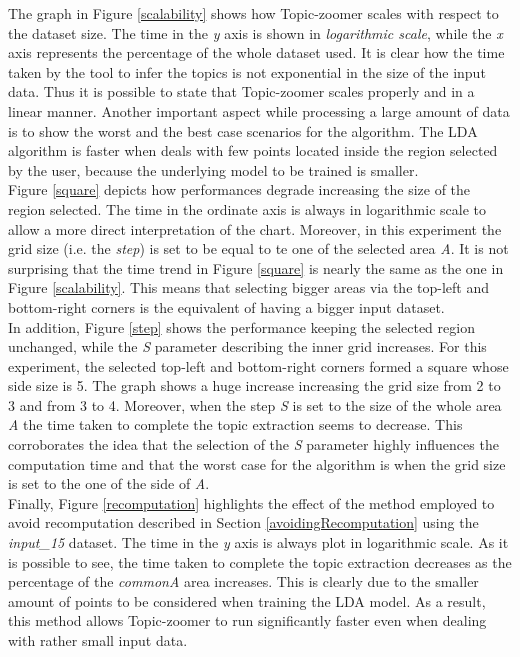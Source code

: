 \documentclass{sig-alternate-05-2015}
\begin{document}
The graph in Figure \ref{scalability} shows how Topic-zoomer scales with respect to the dataset size. The time in the \emph{y} axis is shown in \emph{logarithmic scale}, while the \emph{x} axis represents the percentage of the whole dataset used. It is clear how the time taken by the tool to infer the topics is not exponential in the size of the input data. Thus it is possible to state that Topic-zoomer scales properly and in a linear manner.  
Another important aspect while processing a large amount of data is to show the worst and the best case scenarios for the algorithm. The LDA algorithm is faster when deals with few points located inside the region selected by the user, because the underlying model to be trained is smaller.\\
Figure \ref{square} depicts how performances degrade increasing the size of the region selected. The time in the ordinate axis is always in logarithmic scale to allow a more direct interpretation of the chart. Moreover, in this experiment the grid size (i.e. the \emph{step}) is set to be equal to te one of the selected area \emph{A}. It is not surprising that the time trend in Figure \ref{square} is nearly the same as the one in Figure \ref{scalability}. This means that selecting bigger areas via the top-left and bottom-right corners is the equivalent of having a bigger input dataset.\\  
In addition, Figure \ref{step} shows the performance keeping the selected region unchanged, while the \emph{S} parameter describing the inner grid increases. For this experiment, the selected top-left and bottom-right corners formed a square whose side size is 5. The graph shows a huge increase increasing the grid size from 2 to 3 and from 3 to 4. Moreover, when the step \emph{S} is set to the size of the whole area \emph{A} the time taken to complete the topic extraction seems to decrease. This corroborates the idea that the selection of the \emph{S} parameter highly influences the computation time and that the worst case for the algorithm is when the grid size is set to the one of the side of \emph{A}.\\
Finally, Figure \ref{recomputation} highlights the effect of the method employed to avoid recomputation described in Section \ref{avoidingRecomputation} using the \emph{input\_15} dataset. The time in the \emph{y} axis is always plot in logarithmic scale. As it is possible to see, the time taken to complete the topic extraction decreases as the percentage of the \emph{commonA} area increases. This is clearly due to the smaller amount of points to be considered when training the LDA model. As a result, this method allows Topic-zoomer to run significantly faster even when dealing with rather small input data. 
\end{document}
